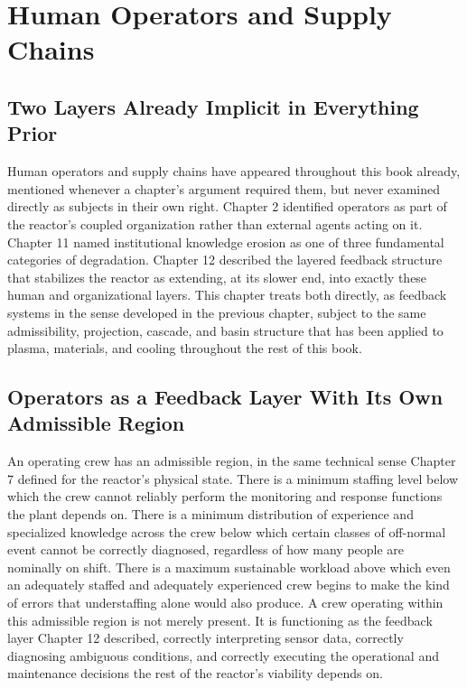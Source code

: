\chapter{Human Operators and Supply Chains}

\section{Two Layers Already Implicit in Everything Prior}

Human operators and supply chains have appeared throughout this book already, mentioned whenever a chapter's argument required them, but never examined directly as subjects in their own right. Chapter 2 identified operators as part of the reactor's coupled organization rather than external agents acting on it. Chapter 11 named institutional knowledge erosion as one of three fundamental categories of degradation. Chapter 12 described the layered feedback structure that stabilizes the reactor as extending, at its slower end, into exactly these human and organizational layers. This chapter treats both directly, as feedback systems in the sense developed in the previous chapter, subject to the same admissibility, projection, cascade, and basin structure that has been applied to plasma, materials, and cooling throughout the rest of this book.

\section{Operators as a Feedback Layer With Its Own Admissible Region}

An operating crew has an admissible region, in the same technical sense Chapter 7 defined for the reactor's physical state. There is a minimum staffing level below which the crew cannot reliably perform the monitoring and response functions the plant depends on. There is a minimum distribution of experience and specialized knowledge across the crew below which certain classes of off-normal event cannot be correctly diagnosed, regardless of how many people are nominally on shift. There is a maximum sustainable workload above which even an adequately staffed and adequately experienced crew begins to make the kind of errors that understaffing alone would also produce. A crew operating within this admissible region is not merely present. It is functioning as the feedback layer Chapter 12 described, correctly interpreting sensor data, correctly diagnosing ambiguous conditions, and correctly executing the operational and maintenance decisions the rest of the reactor's viability depends on.

